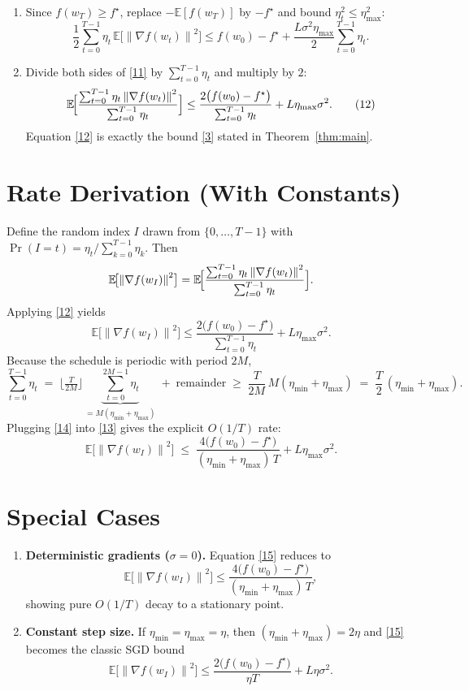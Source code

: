 \documentclass[11pt]{article}
\newcommand{\EE}{\mathbb{E}}
\newcommand{\norm}[1]{\left\lVert #1 \right\rVert}
\begin{document}
\begin{enumerate}
\item[Step 8.] Since $f(w_T)\ge f^{\star}$, replace $-\EE[f(w_T)]$ by $-f^{\star}$ and bound
$\eta_t^{2}\le\eta_{\max}^{2}$:
\[
\frac12\sum_{t=0}^{T-1}\eta_t\,
      \EE\!\bigl[\norm{\nabla f(w_t)}^{2}\bigr]
\le f(w_0)-f^{\star}
   +\frac{L\sigma^{2}\eta_{\max}}{2}\sum_{t=0}^{T-1}\eta_t . \tag{11}
\]

\item[Step 9.] Divide both sides of \eqref{11} by $\sum_{t=0}^{T-1}\eta_t$ and multiply by $2$:
\[
\EE\!\Bigl[\frac{\sum_{t=0}^{T-1}\eta_t\norm{\nabla f(w_t)}^{2}}
                {\sum_{t=0}^{T-1}\eta_t}\Bigr]
\le
\frac{2\bigl(f(w_0)-f^{\star}\bigr)}{\sum_{t=0}^{T-1}\eta_t}
   +L\eta_{\max}\sigma^{2}. \tag{12}
\]
Equation \eqref{12} is exactly the bound \eqref{3} stated in Theorem~\ref{thm:main}.
\end{enumerate}

\section*{Rate Derivation (With Constants)}
Define the random index $I$ drawn from $\{0,\dots,T-1\}$ with
$\Pr(I=t)=\eta_t/\sum_{k=0}^{T-1}\eta_k$.  Then
\[
\EE\!\bigl[\norm{\nabla f(w_I)}^{2}\bigr]
=
\EE\!\Bigl[\frac{\sum_{t=0}^{T-1}\eta_t\norm{\nabla f(w_t)}^{2}}
                {\sum_{t=0}^{T-1}\eta_t}\Bigr].
\]
Applying \eqref{12} yields
\[
\EE\!\bigl[\norm{\nabla f(w_I)}^{2}\bigr]
\le
\frac{2\bigl(f(w_0)-f^{\star}\bigr)}{\sum_{t=0}^{T-1}\eta_t}
   +L\eta_{\max}\sigma^{2}. \tag{13}
\]
Because the schedule is periodic with period $2M$,
\[
\sum_{t=0}^{T-1}\eta_t
\;=\;
\bigl\lfloor\tfrac{T}{2M}\bigr\rfloor\,
  \underbrace{\sum_{t=0}^{2M-1}\eta_t}_{=M(\eta_{\min}+\eta_{\max})}
\;+\;
\text{remainder}\;\ge\;
\frac{T}{2M}\,M(\eta_{\min}+\eta_{\max})
\;=\;
\frac{T}{2}\,(\eta_{\min}+\eta_{\max}). \tag{14}
\]
Plugging \eqref{14} into \eqref{13} gives the explicit $O(1/T)$ rate:
\[
\EE\!\bigl[\norm{\nabla f(w_I)}^{2}\bigr]
\;\le\;
\frac{4\bigl(f(w_0)-f^{\star}\bigr)}{(\eta_{\min}+\eta_{\max})\,T}
   +L\eta_{\max}\sigma^{2}. \tag{15}
\]

\section*{Special Cases}
\begin{enumerate}[leftmargin=*]
\item \textbf{Deterministic gradients ($\sigma=0$).}  
Equation \eqref{15} reduces to
\[
\EE\!\bigl[\norm{\nabla f(w_I)}^{2}\bigr]
\le \frac{4\bigl(f(w_0)-f^{\star}\bigr)}
           {(\eta_{\min}+\eta_{\max})\,T},
\]
showing pure $O(1/T)$ decay to a stationary point.

\item \textbf{Constant step size.}  
If $\eta_{\min}=\eta_{\max}=\eta$, then $(\eta_{\min}+\eta_{\max})=2\eta$ and
\eqref{15} becomes the classic SGD bound
\[
\EE\!\bigl[\norm{\nabla f(w_I)}^{2}\bigr]
\le \frac{2\bigl(f(w_0)-f^{\star}\bigr)}{\eta T}
   +L\eta\sigma^{2}.
\]
\end{enumerate}
\end{document}
